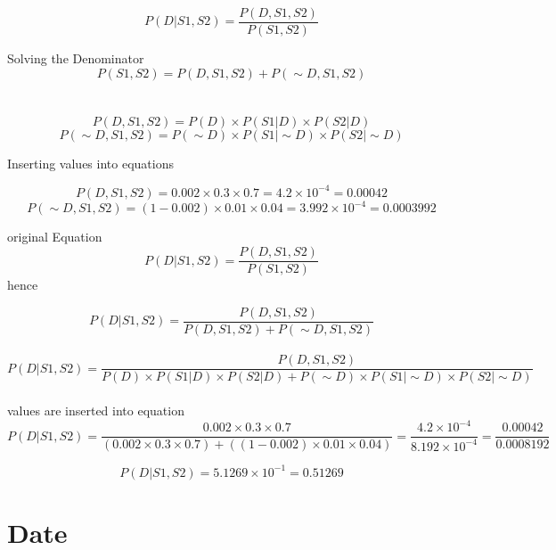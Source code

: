 \documentclass[12pt,a4paper]{article}
\begin{document}
\[P(D|S1, S2)=\frac{P(D, S1, S2)}{P(S1, S2)}\]

Solving the Denominator 
\[P(S1, S2) =P(D, S1, S2) + P(\sim D, S1, S2)\]\\

\\
\[ P(D,S1,S2)=P(D) \times P(S1|D) \times P(S2|D)\]
\[P(\sim D, S1, S2)=P(\sim D) \times P(S1|\sim D) \times P(S2|\sim D)\]

Inserting values into equations

\[ P(D,S1,S2)=0.002 \times 0.3 \times 0.7= 4.2 \times 10^{-4} = 0.00042\]
\[P(\sim D, S1, S2) = (1-0.002) \times 0.01 \times 0.04 = 3.992 \times 10^{-4}= 0.0003992 \]
	
		 original Equation
		\[P(D|S1, S2)=\frac{P(D, S1, S2)}{P(S1, S2)}\]
		hence 
		
	\[P(D|S1, S2)=\frac{P(D, S1, S2)}{P(D,S1,S2)+P(\sim D,S1,S2)}\] \\
		\[P(D|S1, S2)=\frac{P(D, S1, S2)}{P(D) \times P(S1|D) \times P(S2|D)+P(\sim D) \times P(S1|\sim D) \times P(S2|\sim D)}\]\\

	values are inserted into equation
		\[P(D|S1, S2)=\frac{0.002 \times 0.3 \times 0.7}{(0.002 \times 0.3 \times 0.7)+((1-0.002) \times 0.01 \times 0.04)}=\frac{4.2 \times 10^{-4}}{8.192 \times 10^{-4}}= \frac{0.00042}{0.0008192}\]
	
\[P(D|S1, S2)=5.1269 \times 10^{-1}= 0.51269\]
	
	\section{Date}
	\date{\today}
	
	

	

	
	
\end{document}
